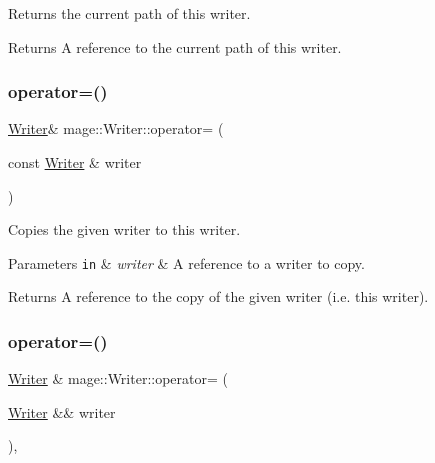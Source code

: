 Returns the current path of this writer.

\begin{DoxyReturn}{Returns}
A reference to the current path of this writer. 
\end{DoxyReturn}
\mbox{\label{classmage_1_1_writer_a81ea888d1b170515713432ca28629ceb}} 
\subsubsection{\texorpdfstring{operator=()}{operator=()}\hspace{0.1cm}{\footnotesize\ttfamily [1/2]}}
{\footnotesize\ttfamily \mbox{\hyperlink{classmage_1_1_writer}{Writer}}\& mage\+::\+Writer\+::operator= (\begin{DoxyParamCaption}\item[{const \mbox{\hyperlink{classmage_1_1_writer}{Writer}} \&}]{writer }\end{DoxyParamCaption})\hspace{0.3cm}{\ttfamily [delete]}}

Copies the given writer to this writer.


\begin{DoxyParams}[1]{Parameters}
\mbox{\tt in}  & {\em writer} & A reference to a writer to copy. \\
\hline
\end{DoxyParams}
\begin{DoxyReturn}{Returns}
A reference to the copy of the given writer (i.\+e. this writer). 
\end{DoxyReturn}
\mbox{\label{classmage_1_1_writer_a03a93796179f22be90471bea0f7a7cf0}} 
\subsubsection{\texorpdfstring{operator=()}{operator=()}\hspace{0.1cm}{\footnotesize\ttfamily [2/2]}}
{\footnotesize\ttfamily \mbox{\hyperlink{classmage_1_1_writer}{Writer}} \& mage\+::\+Writer\+::operator= (\begin{DoxyParamCaption}\item[{\mbox{\hyperlink{classmage_1_1_writer}{Writer}} \&\&}]{writer }\end{DoxyParamCaption})\hspace{0.3cm}{\ttfamily [default]}, {\ttfamily [noexcept]}}

